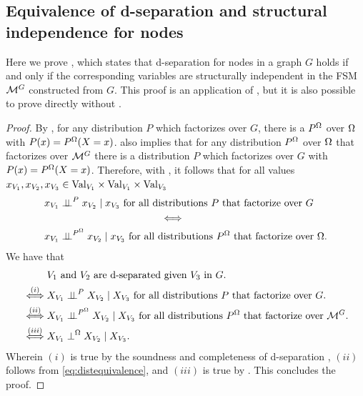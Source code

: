 \documentclass[USenglish,onecolumn]{article}
\begin{document}
\subsection{Equivalence of d-separation and structural independence for nodes}
\label{sec:proof-d-sep-str-indep}

Here we prove , which states that d-separation for nodes in a graph $G$ holds if and only if the corresponding variables are structurally independent in the FSM $\mathcal{M}^G$ constructed from $G$. This proof is an application of , but it is also possible to prove  directly without .

\dseparationstructuralindependence*
\begin{proof}
    By , for any distribution $P$ which factorizes over $G$, there is a $P^\Omega$ over $\Omega$ with $P(x)=P^\Omega(X=x)$.
 also implies that for any distribution $P^\Omega$ over $\Omega$ that factorizes over $\mathcal{M}^G$ there is a distribution $P$ which factorizes over $G$ with $P(x)=P^\Omega(X=x)$.
Therefore, with , it follows that for  all values $x_{V_1}, x_{V_2}, x_{V_3}\in \textnormal{Val}_{V_1}\times \textnormal{Val}_{V_1}\times \textnormal{Val}_{V_3}$
\begin{equation}
\begin{aligned}
\label{eq:distequivalence}
    &\text{$x_{V_1} \indep^{P} x_{V_2} \given x_{V_3}$
     for all distributions $P$ that factorize over $G$}\\
     &\hspace{4cm}\iff\\
    &\text{$x_{V_1} \indep^{\Pomg} x_{V_2} \given x_{V_3}$  for all distributions $\Pomg$ that factorize over $\Omg$.}
\end{aligned}
\end{equation}
We have that
\begin{align*}
&\text{$V_1$~and~$V_2$ are d-separated given $V_3$ in $G$.}\\
\overset{(i)}{\iff}&\text{$X_{V_1} \mathrel{\perp\!\!\!\perp}^{P} X_{V_2} \mid X_{V_3}$ for all distributions $P$ that factorize over $G$.} \\
\overset{(ii)}{\iff} &\text{$X_{V_1} \mathrel{\perp\!\!\!\perp}^{P^\Omega} X_{V_2} \mid X_{V_3}$ for all distributions $P^\Omega$ that factorize over $\mathcal{M}^G$.}\\
\overset{(iii)}{\iff} &\text{$X_{V_1} \mathrel{\perp}^\Omega X_{V_2} \mid X_{V_3}$.}
\end{align*}
Wherein $(i)$ is true by the soundness and completeness of d-separation \cite{koller2009probabilistic}, $(ii)$ follows from \eqref{eq:distequivalence}, and $(iii)$ is true by  .
This concludes the proof.
%
\end{proof}
\end{document}
